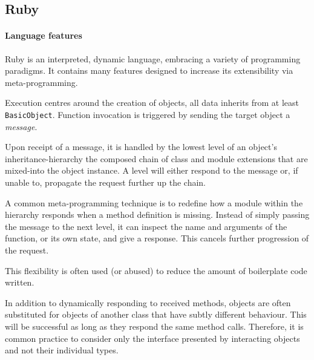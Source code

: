\subsection{Ruby}
\paragraph*{Language features}
Ruby\cite{rubylang} is an interpreted, dynamic language, embracing a variety of programming paradigms. It contains many features designed to increase its extensibility via meta-programming.

Execution centres around the creation of objects, all data inherits from at least \verb|BasicObject|. Function invocation is triggered by sending the target object a \emph{message}.

Upon receipt of a message, it is handled by the lowest level of an object's inheritance-hierarchy \textemdash{} the composed chain of class and module extensions that are mixed-into the object instance. A level will either respond to the message or, if unable to, propagate the request further up the chain.

A common meta-programming technique is to redefine how a module within the hierarchy responds when a method definition is missing. Instead of simply passing the message to the next level, it can inspect the name and arguments of the function, or its own state, and give a response. This cancels further progression of the request.

\begin{comment}
\begin{lstlisting}[
  language=Ruby,
  label=lst:methmiss,
  caption=A toy example where an object responds to a missing method instead of propagating the message.
]
class HungryHippo
  def eat
    puts "Nom nom nom!"
  end

  def method_missing(meth, *args, &block)
    if /eat/.match meth.to_s
      puts "Eat? ok then."
      eat
    else
      super
    end
  end
end

hippo = HungryHippo.new
hippo.eat
hippo.dont_eat
# >> Nom nom nom!
# >> Eat? ok then.
# >> Nom nom nom!
\end{lstlisting}
\end{comment}

This flexibility is often used (or abused) to reduce the amount of boilerplate code written.

In addition to dynamically responding to received methods, objects are often substituted for objects of another class that have subtly different behaviour. This will be successful as long as they respond the same method calls. Therefore, it is common practice to consider only the interface presented by interacting objects and not their individual types.

